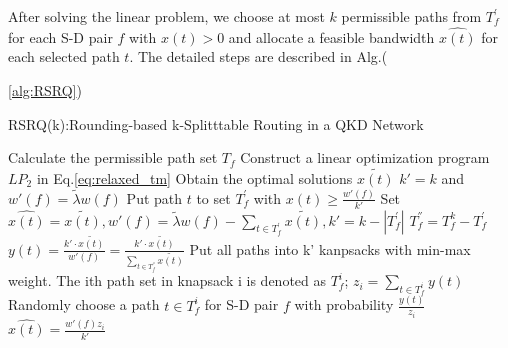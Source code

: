 After solving the linear problem, we choose at most $k$ permissible paths from $T^{'}_{f}$ for each S-D pair $f$ with $x(t) > 0$ and allocate a feasible bandwidth $\hat{x(t)}$ for each selected path $t$. The detailed steps are described in Alg.({\ref{alg:RSRQ})

\begin{algorithm}[h]\label{RSRQ}
	\caption{RSRQ(k):Rounding-based k-Splitttable Routing in a QKD Network}
	\begin{algorithmic}[1]
		\STATE Calculate the permissible path set $T_f$
		\ENDFOR
		\STATE  Construct a linear optimization program $LP_2$ in Eq.\ref{eq:relaxed_tm}
		\STATE Obtain the optimal solutions $\widetilde{x(t)}$
		\STATE $k' = k$ and $w'(f) = \widetilde{\lambda}w(f)$
		\STATE Put path $t$ to set $T^{'}_f$ with $x(t) \ge \frac{w'(f)}{k'}$
		\STATE Set $\hat{x(t)} = \widetilde{x(t)}, w'(f) = \widetilde{\lambda}w(f) - \sum_{t \in T^{'}_f} \widetilde{x(t)}, k' = k - |T^{'}_f|$
		\ENDWHILE
		\STATE $T^{''}_{f} = T^k_f - T^{'}_f$
		\STATE $y(t) = \frac{k' \cdot \widetilde{x(t)}}{w'(f)} = \frac{k' \cdot \widetilde{x(t)}}{\sum_{t \in T^{''}_f} \widetilde{x(t)}}$
		\ENDFOR
		\STATE Put all paths into k' kanpsacks with min-max weight. The ith path set in knapsack i is denoted as $T^i_f$;
		\STATE $z_i = \sum_{t \in T^i_f}y(t)$
		\STATE Randomly choose a path $t \in T^i_f$ for S-D pair $f$ with probability $\frac{y(t)}{z_i}$
		\STATE $\hat{x(t)} = \frac{w'(f)z_i}{k'}$
		\ENDFOR
		\ENDFOR
	\end{algorithmic}
\end{algorithm}


}
